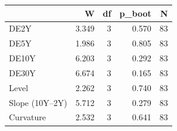 \begin{tabular}{lrrrr}
\toprule
 & W & df & p\_boot & N \\
\midrule
DE2Y & 3.349 & 3 & 0.570 & 83 \\
DE5Y & 1.986 & 3 & 0.805 & 83 \\
DE10Y & 6.203 & 3 & 0.292 & 83 \\
DE30Y & 6.674 & 3 & 0.165 & 83 \\
Level & 2.262 & 3 & 0.740 & 83 \\
Slope (10Y--2Y) & 5.712 & 3 & 0.279 & 83 \\
Curvature & 2.532 & 3 & 0.641 & 83 \\
\bottomrule
\end{tabular}
